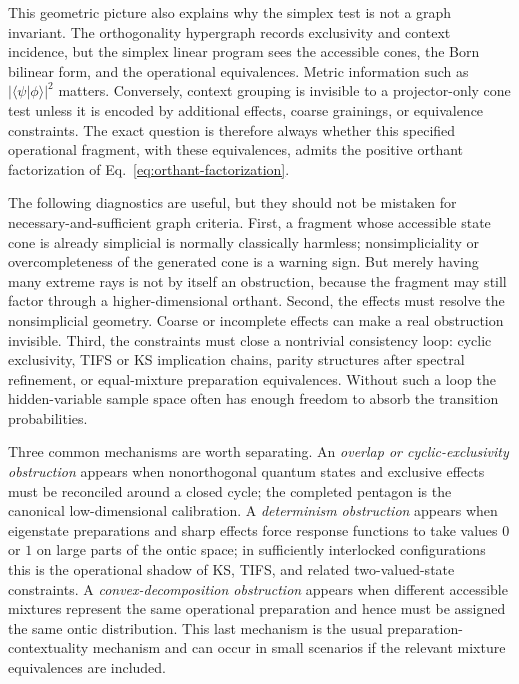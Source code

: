 \documentclass[aps,pra,twocolumn,superscriptaddress,nofootinbib]{revtex4-2}
\begin{document}
This geometric picture also explains why the simplex test is not a graph invariant.  The orthogonality hypergraph records exclusivity and context incidence, but the simplex linear program sees the accessible cones, the Born bilinear form, and the operational equivalences.  Metric information such as $|\langle\psi|\phi\rangle|^2$ matters.  Conversely, context grouping is invisible to a projector-only cone test unless it is encoded by additional effects, coarse grainings, or equivalence constraints.  The exact question is therefore always whether this specified operational fragment, with these equivalences, admits the positive orthant factorization of Eq.~\eqref{eq:orthant-factorization}.

The following diagnostics are useful, but they should not be mistaken for necessary-and-sufficient graph criteria.  First, a fragment whose accessible state cone is already simplicial is normally classically harmless; nonsimpliciality or overcompleteness of the generated cone is a warning sign.  But merely having many extreme rays is not by itself an obstruction, because the fragment may still factor through a higher-dimensional orthant.  Second, the effects must resolve the nonsimplicial geometry.  Coarse or incomplete effects can make a real obstruction invisible.  Third, the constraints must close a nontrivial consistency loop: cyclic exclusivity, TIFS or KS implication chains, parity structures after spectral refinement, or equal-mixture preparation equivalences.  Without such a loop the hidden-variable sample space often has enough freedom to absorb the transition probabilities.

Three common mechanisms are worth separating.  An \emph{overlap or cyclic-exclusivity obstruction} appears when nonorthogonal quantum states and exclusive effects must be reconciled around a closed cycle; the completed pentagon is the canonical low-dimensional calibration.  A \emph{determinism obstruction} appears when eigenstate preparations and sharp effects force response functions to take values $0$ or $1$ on large parts of the ontic space; in sufficiently interlocked configurations this is the operational shadow of KS, TIFS, and related two-valued-state constraints.  A \emph{convex-decomposition obstruction} appears when different accessible mixtures represent the same operational preparation and hence must be assigned the same ontic distribution.  This last mechanism is the usual preparation-contextuality mechanism and can occur in small scenarios if the relevant mixture equivalences are included.
\end{document}
